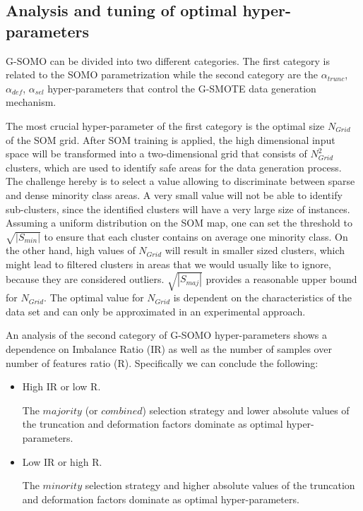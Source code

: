 \documentclass[parskip=full]{scrartcl}
\begin{document}
\subsection{Analysis and tuning of optimal hyper-parameters}

G-SOMO can be divided into two different categories. The first category is
related to the SOMO parametrization while the second category are the
$\alpha_{trunc}$, $\alpha_{def}$, $\alpha_{sel}$ hyper-parameters that control
the G-SMOTE data generation mechanism.

The most crucial hyper-parameter of the first category is the optimal size
$N_{Grid}$ of the SOM grid. After SOM training is applied, the high dimensional
input space will be transformed into a two-dimensional grid that consists of
$N_{Grid}^2$ clusters, which are used to identify safe areas for the data
generation process. The challenge hereby is to select a value allowing to
discriminate between sparse and dense minority class areas.  A very small value
will not be able to identify sub-clusters, since the identified clusters will
have a very large size of instances. Assuming a uniform distribution on the SOM
map, one can set the threshold to $\sqrt{|S_{min}|}$ to ensure that each cluster
contains on average one minority class. On the other hand, high values of
$N_{Grid}$ will result in smaller sized clusters, which might lead to filtered
clusters in areas that we would usually like to ignore, because they are
considered outliers. $\sqrt{|S_{maj}|}$ provides a reasonable upper bound for
$N_{Grid}$. The optimal value for $N_{Grid}$ is dependent on the characteristics
of the data set and can only be approximated in an experimental approach.

An analysis of the second category of G-SOMO hyper-parameters shows a dependence
on Imbalance Ratio (IR) as well as the number of samples over number of features
ratio (R). Specifically we can conclude the following: 

\begin{itemize}
	
	\renewcommand\labelitemi{--}

	\item High IR or low R.
	
	The $ majority $ (or $ combined $) selection strategy and lower absolute
	values of the truncation and deformation factors dominate as optimal
	hyper-parameters.

	\item Low IR or high R. 
	
	The $ minority $ selection strategy and higher absolute values of the
	truncation and deformation factors dominate as optimal hyper-parameters.

\end{itemize}
\end{document}
